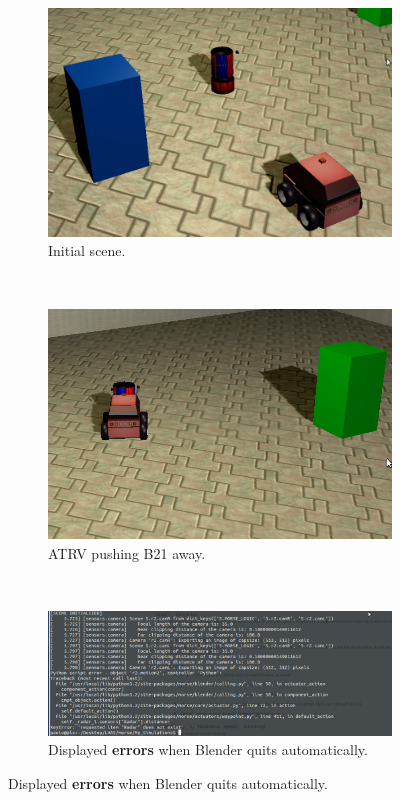 \begin{enumerate}
\begin{figure}[!ht] %
\begin{center}
\begin{subfigure}[!ht]{0.48\textwidth}
  \centering
  \includegraphics[width=\textwidth]{Bug_Pics/Waypoint/waypoint_1.png}
  \caption{Initial scene.}
\end{subfigure}
~
\begin{subfigure}[!ht]{0.48\textwidth}
  \centering
  \includegraphics[width=\textwidth]{Bug_Pics/Waypoint/waypoint_2.png}
  \caption{ATRV pushing B21 away.}
\end{subfigure}
\\
\begin{subfigure}[!ht]{1.0\textwidth}
  \centering
  \includegraphics[width=\textwidth]{Bug_Pics/Waypoint/waypoint_3.png}
  \caption{Displayed \textbf{errors} when Blender quits automatically. \label{waypoint_errors}}
\end{subfigure}


\end{center}
\end{figure}
\end{enumerate}
